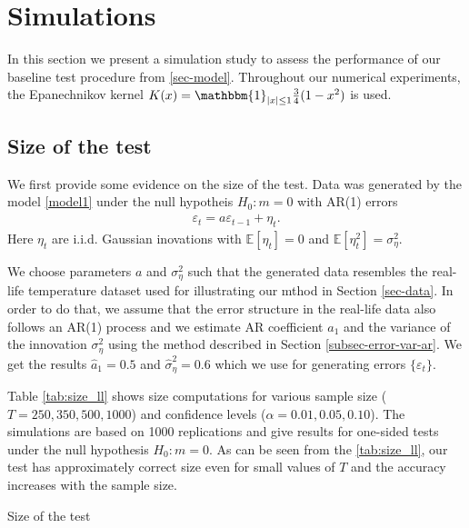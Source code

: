 
\section{Simulations}\label{sec-sim}
In this section we present a simulation study to assess the performance of our baseline test procedure from \ref{sec-model}. Throughout our numerical experiments, the Epanechnikov kernel $K(x) = \mathbbm{1}_{|x|\leq 1} \frac{3}{4} (1 - x^2)$ is used.

\subsection{Size of the test}\label{subsec-sim-size}
We first provide some evidence on the size of the test. Data was generated by the model \ref{model1} under the null hypotheis $H_0: m=0$ with AR(1) errors
\begin{align*}
\varepsilon_t = a \varepsilon_{t-1} + \eta_t.
\end{align*}
Here $\eta_t$ are i.i.d. Gaussian inovations with $\mathbb{E}[\eta_t] = 0$ and $\mathbb{E}[\eta_t^2] = \sigma_{\eta}^2$.

We choose parameters $a$ and $ \sigma_{\eta}^2$ such that the generated data resembles the real-life temperature dataset used for illustrating our mthod in Section \ref{sec-data}. In order to do that, we assume that the error structure in the real-life data also follows an AR(1) process and we estimate AR coefficient $a_1$ and the variance of the innovation $\sigma_{\eta}^2$ using the method described in Section \ref{subsec-error-var-ar}. We get the results $\hat{a}_1 = 0.5$ and $\hat{\sigma}_{\eta}^2 = 0.6$ which we use for generating errors $\{\varepsilon_t\}$.

Table \ref{tab:size_ll} shows size computations for various sample size ($T = 250, 350, 500, 1000$) and confidence levels ($\alpha = 0.01, 0.05, 0.10$). The simulations are based on 1000 replications and give results for one-sided tests under the null hypothesis $H_0: m=0$. As can be seen from the \ref{tab:size_ll}, our test has approximately correct size even for small values of $T$ and the accuracy increases with the sample size.
 
\begin{table}[H]
    \begin{center}
        \caption{Size of the test}
        \label{tab:size_ll}
        \centering
        
    \end{center}
\end{table}

